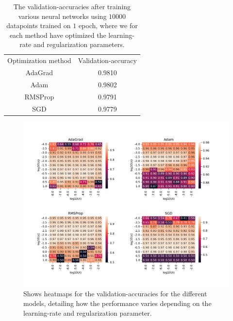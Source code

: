 \documentclass{article}
\begin{document}
\begin{table}
	\centering
	\begin{tabular}{| c | c |}
		Optimization method & Validation-accuracy \\
		AdaGrad             & 0.9810              \\
		Adam                & 0.9802              \\
		RMSProp             & 0.9791              \\
		SGD                 & 0.9779
	\end{tabular}
	\caption{The validation-accuracies after training various neural networks
		using $10 000$ datapoints trained on $1$ epoch, where we for each method
		have optimized the learning-rate and regularization parameters.}
	\label{nnmethodres}
\end{table}

\begin{figure}
	\centerline{\includegraphics[scale=0.7]{nn_test_accuracy_hm}}
	\caption{Shows heatmaps for the validation-accuracies for the different
		models, detailing how the performance varies depending on the learning-rate
		and regularization parameter.}
	\label{nntestacchm}
\end{figure}
\end{document}
